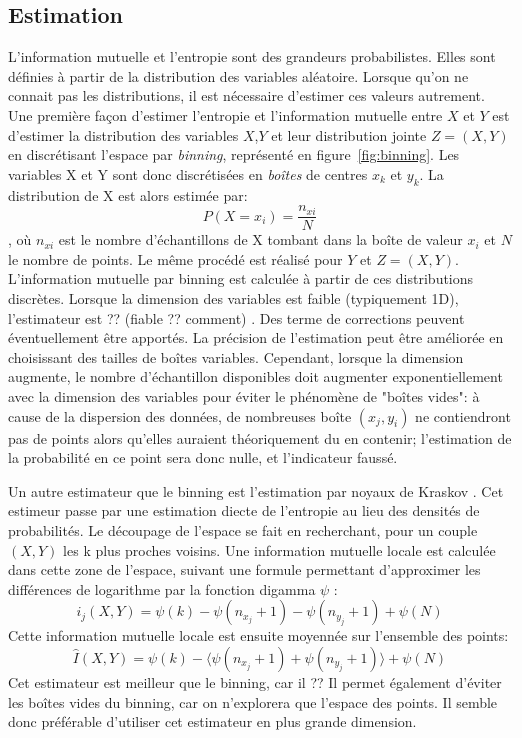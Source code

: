 \subsection{Estimation}
L'information mutuelle et l'entropie sont des grandeurs probabilistes. Elles sont définies à partir de la distribution des variables aléatoire. Lorsque qu'on ne connait pas les distributions, il est nécessaire d'estimer ces valeurs autrement. 
Une première façon d'estimer l'entropie et l'information mutuelle entre $X$ et $Y$ est d'estimer la distribution des variables $X$,$Y$ et leur distribution jointe $Z = (X,Y)$ en discrétisant l'espace par \emph{binning}, représenté en figure~\ref{fig:binning}. Les variables X et Y sont donc discrétisées en \emph{boîtes} de centres $x_k$ et $y_k$. La distribution de X est alors estimée par: 
$$P(X = x_i) = \frac{n_{xi}}{N} $$, où $n_{xi}$ est le nombre d'échantillons de X tombant dans la boîte de valeur $x_i$ et $N$ le nombre de points. Le même procédé est réalisé pour $Y$ et $Z = (X,Y)$.
L'information mutuelle par binning est calculée à partir de ces distributions discrètes.
Lorsque la dimension des variables est faible (typiquement 1D), l'estimateur est ?? (fiable ?? comment) . Des terme de corrections peuvent éventuellement être apportés. La précision de l'estimation peut être améliorée en choisissant des tailles de boîtes variables. Cependant, lorsque la dimension augmente, le nombre d'échantillon disponibles doit augmenter exponentiellement avec la dimension des variables pour éviter le phénomène de "boîtes vides": à cause de la dispersion des données, de nombreuses boîte $(x_j,y_i)$ ne contiendront pas de points alors qu'elles auraient théoriquement du en contenir; l'estimation de la probabilité en ce point sera donc nulle, et l'indicateur faussé. 

Un autre estimateur que le binning est l'estimation par noyaux de Kraskov \cite{2004kraskov}. Cet estimeur passe par une estimation diecte de l'entropie au lieu des densités de probabilités. Le découpage de l'espace se fait en recherchant, pour un couple $(X,Y)$ les k plus proches voisins. Une information mutuelle locale est calculée dans cette zone de l'espace, suivant une formule permettant d'approximer les différences de logarithme par la fonction digamma $\psi$ : 
$$i_j(X,Y) = \psi(k) - \psi(n_{x_j} + 1) - \psi(n_{y_j} +1) + \psi(N)$$
Cette information mutuelle locale est ensuite moyennée sur l'ensemble des points: 
$$\hat{I}(X,Y) = \psi(k) - \langle\psi(n_{x_j} + 1) + \psi(n_{y_j} +1)\rangle + \psi(N)$$
Cet estimateur est meilleur que le binning, car il ?? 
Il permet également d'éviter les boîtes vides du binning, car on n'explorera que l'espace des points. Il semble donc préférable d'utiliser cet estimateur en plus grande dimension.

